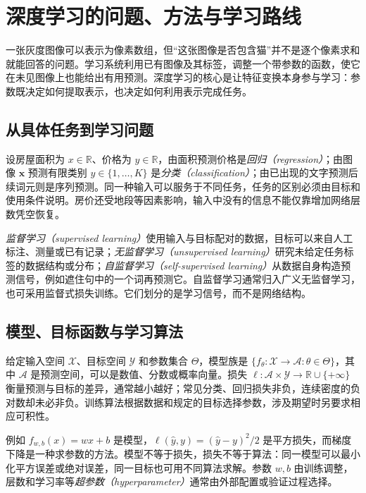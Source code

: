 \setcounter{chapter}{0} %
\chapter{深度学习的问题、方法与学习路线}
\label{chap:dl-introduction}
一张灰度图像可以表示为像素数组，但“这张图像是否包含猫”并不是逐个像素求和就能回答的问题。学习系统利用已有图像及其标签，调整一个带参数的函数，使它在未见图像上也能给出有用预测。深度学习的核心是让特征变换本身参与学习：参数既决定如何提取表示，也决定如何利用表示完成任务。

\section{从具体任务到学习问题}
设房屋面积为 $x\in\mathbb R$、价格为 $y\in\mathbb R$，由面积预测价格是\emph{回归（regression）}；由图像 $\mathbf x$ 预测有限类别 $y\in\{1,\ldots,K\}$ 是\emph{分类（classification）}；由已出现的文字预测后续词元则是序列预测。同一种输入可以服务于不同任务，任务的区别必须由目标和使用条件说明。房价还受地段等因素影响，输入中没有的信息不能仅靠增加网络层数凭空恢复。

\emph{监督学习（supervised learning）}使用输入与目标配对的数据，目标可以来自人工标注、测量或已有记录；\emph{无监督学习（unsupervised learning）}研究未给定任务标签的数据结构或分布；\emph{自监督学习（self-supervised learning）}从数据自身构造预测信号，例如遮住句中的一个词再预测它。自监督学习通常归入广义无监督学习，也可采用监督式损失训练。它们划分的是学习信号，而不是网络结构。

\section{模型、目标函数与学习算法}
\begin{definition}[模型与学习问题]
给定输入空间 $\mathcal X$、目标空间 $\mathcal Y$ 和参数集合 $\Theta$，模型族是 $\{f_\theta:\mathcal X\to\mathcal A:\theta\in\Theta\}$，其中 $\mathcal A$ 是预测空间，可以是数值、分数或概率向量。损失 $\ell:\mathcal A\times\mathcal Y\to\mathbb R\cup\{+\infty\}$ 衡量预测与目标的差异，通常越小越好；常见分类、回归损失非负，连续密度的负对数却未必非负。训练算法根据数据和规定的目标选择参数，涉及期望时另要求相应可积性。
\end{definition}
例如 $f_{w,b}(x)=wx+b$ 是模型，$\ell(\widehat y,y)=(\widehat y-y)^2/2$ 是平方损失，而梯度下降是一种求参数的方法。模型不等于损失，损失不等于算法：同一模型可以最小化平方误差或绝对误差，同一目标也可用不同算法求解。参数 $w,b$ 由训练调整，层数和学习率等\emph{超参数（hyperparameter）}通常由外部配置或验证过程选择。

